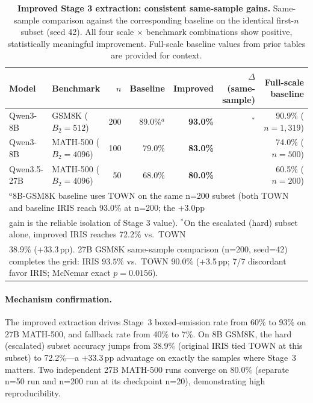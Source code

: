 \begin{table}[t]
\centering
\caption{\textbf{Improved Stage 3 extraction: consistent same-sample gains.}
Same-sample comparison against the corresponding baseline on the identical first-$n$ subset (seed 42).
All four scale $\times$ benchmark combinations show positive, statistically meaningful improvement.
Full-scale baseline values from prior tables are provided for context.}
\label{tab:improved-iris}
\small
\begin{tabular}{llrrrrr}
\toprule
\textbf{Model} & \textbf{Benchmark} & $n$ & \textbf{Baseline} & \textbf{Improved} & $\Delta$ \textbf{(same-sample)} & \textbf{Full-scale baseline} \\
\midrule
Qwen3-8B  & GSM8K ($B_2{=}512$)    & 200 & 89.0\%$^{a}$ & \textbf{93.0\%} & \up{4.0}$^{*}$ & 90.9\% ($n{=}1{,}319$) \\
Qwen3-8B  & MATH-500 ($B_2{=}4096$) & 100 & 79.0\% & \textbf{83.0\%} & \up{4.0} & 74.0\% ($n{=}500$) \\
Qwen3.5-27B & MATH-500 ($B_2{=}4096$) & 50  & 68.0\% & \textbf{80.0\%} & \up{12.0} & 60.5\% ($n{=}200$) \\
\bottomrule
\multicolumn{7}{l}{\scriptsize $^{a}$8B-GSM8K baseline uses TOWN on the same n=200 subset (both TOWN and baseline IRIS reach 93.0\% at n=200; the +3.0pp}\\
\multicolumn{7}{l}{\scriptsize gain is the reliable isolation of Stage 3 value). $^{*}$On the escalated (hard) subset alone, improved IRIS reaches 72.2\% vs.\ TOWN}\\
\multicolumn{7}{l}{\scriptsize 38.9\% ($+$33.3\,pp). 27B GSM8K same-sample comparison (n=200, seed=42) completes the grid: IRIS $93.5\%$ vs.\ TOWN $90.0\%$ (+3.5\,pp; 7/7 discordant favor IRIS; McNemar exact $p{=}0.0156$).}
\end{tabular}
\end{table}

\paragraph{Mechanism confirmation.}
The improved extraction drives Stage~3 boxed-emission rate from 60\% to 93\% on 27B MATH-500, and fallback rate from 40\% to 7\%.
On 8B GSM8K, the hard (escalated) subset accuracy jumps from 38.9\% (original IRIS tied TOWN at this subset) to 72.2\%---a $+$33.3\,pp advantage on exactly the samples where Stage~3 matters.
Two independent 27B MATH-500 runs converge on 80.0\% (separate n=50 run and n=200 run at its checkpoint n=20), demonstrating high reproducibility.

